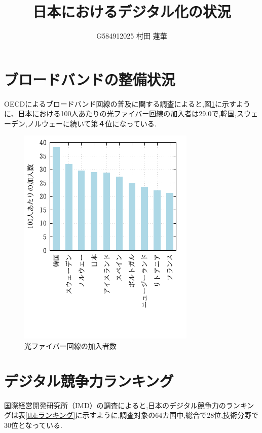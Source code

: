 \documentclass[a4paper,11pt,dvipdfmx]{ujarticle}
\title{日本におけるデジタル化の状況}
\author{G584912025 村田 蓮華}
\begin{document}
\maketitle %

\section{ブロードバンドの整備状況}

OECDによるブロードバンド回線の普及に関する調査\cite{oecd}によると,図\ref{fig:加入数}に示すように、日本における100人あたりの光ファイバー回線の加入者は29.0で,韓国,スウェーデン,ノルウェーに続いて第４位になっている.

\begin{figure}[htbp]
    \centering
    \includegraphics{fig11.png}
    \caption{光ファイバー回線の加入者数}\label{fig:加入数}
\end{figure}

\section{デジタル競争力ランキング}

国際経営開発研究所（IMD）の調査\cite{imd}によると,日本のデジタル競争力のランキングは表\ref{tbl:ランキング}に示すように,調査対象の64カ国中,総合で28位,技術分野で30位となっている.
\end{document}
